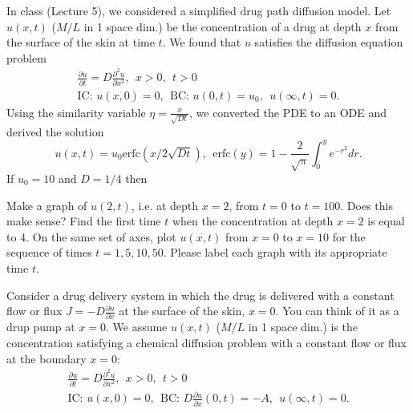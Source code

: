 \documentclass[
	number={3},
	title={}
]{math486homework}
\begin{document}
\maketitle

\begin{problems}
	\problem In class (Lecture 5), we considered a simplified drug path diffusion model.
	Let $u(x,t)$ ($M/L$ in 1 space dim.) be the concentration of a drug at depth $x$ from the surface of the skin at time $t$.
	We found that $u$ satisfies the diffusion equation problem
	\begin{equation*}
	\begin{aligned}
		\frac{\partial u}{\partial t} = D\frac{\partial^{2} u}{\partial x^{2}},\ \ x > 0,\ \ t > 0\\
		\mbox{IC: } u(x, 0) = 0,\ \ \mbox{BC: } u(0, t) = u_{0},\ \ u(\infty, t) = 0.
	\end{aligned}
	\end{equation*}
	Using the similarity variable $\eta = \frac{x}{\sqrt{Dt}}$, we converted the PDE to an ODE and derived the solution
	\begin{equation}
		u(x,t) = u_{0}\mbox{erfc}\left( x / 2\sqrt{Dt} \right),\ \ \mbox{erfc}(y) = 1 - \frac{2}{\sqrt{\pi}}\int_{0}^{y} e^{-r^{2}}dr.
		\label{eq:3.1}
	\end{equation}
	If $u_{0} = 10$ and $D = 1/4$ then
	\begin{problems}
		\subproblem Make a graph of $u(2,t)$, i.e. at depth $x=2$, from $t=0$ to $t=100$.
		Does this make sense? 
		\subproblem Find the first time $t$ when the concentration at depth $x=2$ is equal to 4. 
		\subproblem On the same set of axes, plot $u(x,t)$ from $x=0$ to $x=10$ for the sequence of times $t=1, 5, 10, 50$.
		Please label each graph with its appropriate time $t$. 
	\end{problems}
	\problem Consider a drug delivery system in which the drug is delivered with a constant flow or flux $J = -D\frac{\partial u}{\partial x}$ at the surface of the skin, $x=0$.
	You can think of it as a drup pump at $x=0$.
	We assume $u(x,t)$ ($M/L$ in 1 space dim.) is the concentration satisfying a chemical diffusion problem with a constant flow or flux at the boundary $x=0$:
	\begin{equation*}
		\begin{aligned}
			\frac{\partial u}{\partial t} = D\frac{\partial^{2} u}{\partial x^{2}},\ \ x > 0,\ \ t > 0\\
			\mbox{IC: } u(x, 0) = 0,\ \ \mbox{BC: } D\frac{\partial u}{\partial x}(0, t) = -A,\ \ u(\infty, t)=0.
		\end{aligned}
	\end{equation*}


\end{problems}
\end{document}

